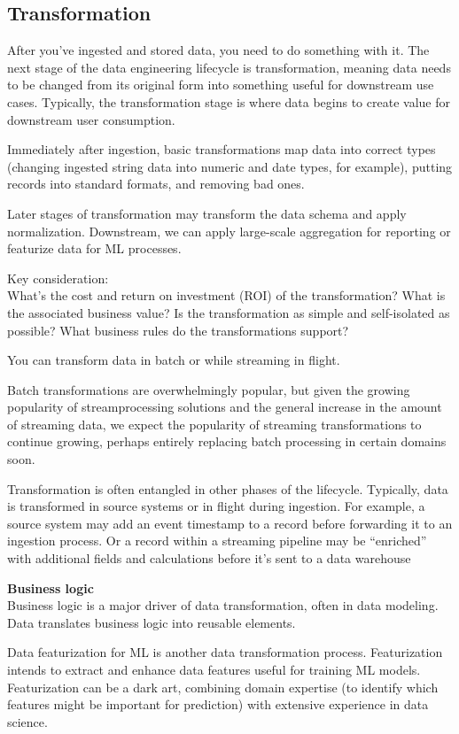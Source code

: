 \documentclass[12pt]{book}
\begin{document}
\subsection{Transformation}
After you’ve ingested and stored data, you need to do something with it.
The next stage of the data engineering lifecycle is transformation, meaning
data needs to be changed from its original form into something useful for
downstream use cases.
Typically, the transformation stage is where data begins to create value for downstream
user consumption.

Immediately after ingestion, basic transformations map data into correct
types (changing ingested string data into numeric and date types, for
example), putting records into standard formats, and removing bad ones.

Later stages of transformation may transform the data schema and apply
normalization. Downstream, we can apply large-scale aggregation for
reporting or featurize data for ML processes.

Key consideration:\\
What’s the cost and return on investment (ROI) of the transformation? What is the associated business value?
Is the transformation as simple and self-isolated as possible?
What business rules do the transformations support?

You can transform data in batch or while streaming in flight.

Batch transformations are overwhelmingly popular, but given the growing popularity of streamprocessing
solutions and the general increase in the amount of streaming
data, we expect the popularity of streaming transformations to continue
growing, perhaps entirely replacing batch processing in certain domains
soon.

Transformation is often entangled in other phases
of the lifecycle. Typically, data is transformed in source systems or in flight
during ingestion. For example, a source system may add an event
timestamp to a record before forwarding it to an ingestion process. Or a
record within a streaming pipeline may be “enriched” with additional fields
and calculations before it’s sent to a data warehouse

\textbf{Business logic}\\
Business logic is a major driver of data transformation, often in data
modeling. Data translates business logic into reusable elements.

Data featurization for ML is another data transformation process.
Featurization intends to extract and enhance data features useful for training
ML models. Featurization can be a dark art, combining domain expertise (to
identify which features might be important for prediction) with extensive
experience in data science.
\end{document}
